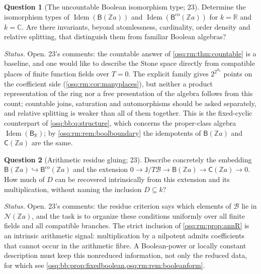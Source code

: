 \documentclass[11pt,letterpaper]{article}
\numberwithin{equation}{section}
\theoremstyle{definition}
\newtheorem{question}[question]{Question}
\theoremstyle{remark}
\theoremstyle{plain}
\newcommand{\Z}{\mathbb Z}
\newcommand{\R}{\mathbb R}
\newcommand{\C}{\mathbb C}
\newcommand{\NN}{\mathcal N}         %
\newcommand{\Idem}{\operatorname{Idem}}
\begin{document}
\begin{question}[The uncountable Boolean isomorphism type; 23]\label{osq:rm:q:boolean}
Determine the isomorphism types of $\Idem(\mathsf B(\Z a))$ and $\Idem(\mathsf B^{\mathrm{co}}(\Z a))$ for $k=\R$ and $k=\C$. Are there invariants,
beyond atomlessness, cardinality, order density and relative splitting, that distinguish them from familiar Boolean algebras?
\end{question}
\emph{Status.} Open. 23's comments: the countable answer of \cref{osq:rm:thm:countable} is a baseline, and one would like to describe the Stone space
directly from compatible places of finite function fields over $T=0$. The explicit family gives $2^{2^{\aleph_0}}$ points on the coefficient side
(\cref{osq:rm:cor:manyplaces}), but neither a product representation of the ring nor a free presentation of the algebra follows from this count;
countable joins, saturation and automorphisms should be asked separately, and relative splitting is weaker than all of them together. This is the
fixed-cyclic counterpart of \cref{osq:bb:q:structure}, which concerns the proper-class algebra $\Idem(\mathsf B_\R)$; by
\cref{osq:rm:rem:boolboundary} the idempotents of $\mathsf B(\Z a)$ and $\mathsf C(\Z a)$ are the same.

\begin{question}[Arithmetic residue gluing; 23]\label{osq:rm:q:gluing}
Describe concretely the embedding $\mathsf B(\Z a)\hookrightarrow\mathsf B^{\mathrm{co}}(\Z a)$ and the extension
$0\to\mathsf J/T\mathscr B\to\mathsf B(\Z a)\to\mathsf C(\Z a)\to0$. How much of $D$ can be recovered intrinsically from this extension and its
multiplication, without naming the inclusion $D\subseteq k$?
\end{question}
\emph{Status.} Open. 23's comments: the residue criterion says which elements of $\mathscr B$ lie in $\NN(\Z a)$, and the task is to organize these
conditions uniformly over all finite fields and all compatible branches. The strict inclusion of \cref{osq:rm:prop:annR} is an intrinsic arithmetic
signal: multiplication by a nilpotent admits coefficients that cannot occur in the arithmetic fibre. A Boolean-power or locally constant description
must keep this nonreduced information, not only the reduced data, for which see \cref{osq:bb:prop:fixedboolean,osq:rm:rem:booleanform}.
\end{document}
